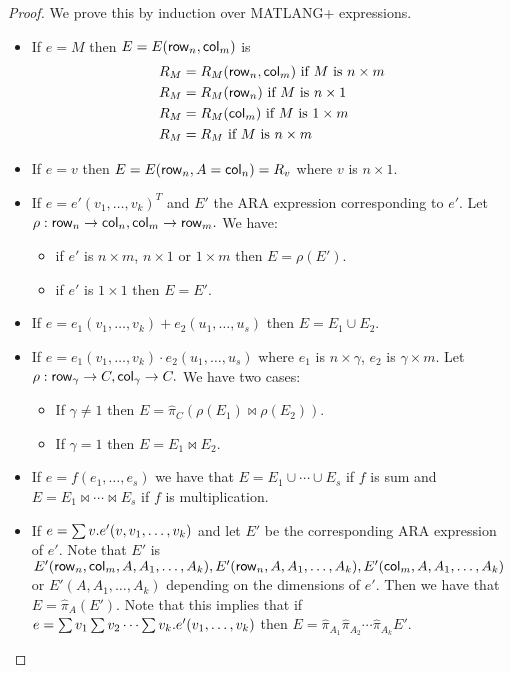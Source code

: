 \begin{proof}

We prove this by induction over MATLANG+ expressions.
\begin{itemize}
	\item If $e=M$ then $E=E(\mathsf{row}_n,\mathsf{col}_m)$ is 
		\begin{align*}
			R_{M}&=R_{M}(\mathsf{row}_n,\mathsf{col}_m) \text{ if } M \text{ is } n\times m \\
			R_{M}&=R_{M}(\mathsf{row}_n) \text{ if } M \text{ is } n\times 1 \\
			R_{M}&=R_{M}(\mathsf{col}_m) \text{ if } M \text{ is } 1\times m \\
			R_{M}&=R_{M} \text{ if } M \text{ is } n\times m 
		\end{align*}
	\item If $e=v$ then $E=E(\mathsf{row}_n,A=\mathsf{col}_n)=R_{v}$ where $v$ is $n\times 1$.
	\item If $e=e'(v_1,\ldots,v_k)^T$ and $E'$ the ARA expression corresponding to $e'$. Let $\rho:\mathsf{row}_n\rightarrow\mathsf{col}_n,\mathsf{col}_m\rightarrow\mathsf{row}_m.$ We have:
		\begin{itemize}
			\item if $e'$ is $n\times m$, $n\times 1$ or $1\times m$ then $E=\rho\left( E'\right).$
			\item if $e'$ is $1\times 1$ then $E=E'$.
		\end{itemize}
	\item If $e=e_1(v_1,\ldots,v_k)+e_2(u_1,\ldots,u_s)$ then $E=E_1\cup E_2$.
	\item If $e=e_1(v_1,\ldots,v_k)\cdot e_2(u_1,\ldots,u_s)$ where $e_1$ is $n\times\gamma$, $e_2$ is $\gamma\times m$. Let $\rho:\mathsf{row}_\gamma\rightarrow C,\mathsf{col}_\gamma\rightarrow C.$ We have two cases:
		\begin{itemize}
			\item If $\gamma\neq 1$ then $E=\widehat{\pi}_C\left( \rho\left(E_1\right)\bowtie\rho\left( E_2\right)\right).$
			\item If $\gamma = 1$ then $E=E_1\bowtie E_2$.
		\end{itemize}
	\item If $e=f(e_1,\ldots,e_s)$ we have that $E=E_1\cup\cdots\cup E_s$ if $f$ is sum and $E=E_1\bowtie\cdots\bowtie E_s$ if $f$ is multiplication.
	\item If $e=\textstyle\sum v.e'(v,v_1,\ldots, v_k)$ and let $E'$ be the corresponding ARA expression of $e'$. Note that $E'$ is $E'(\mathsf{row}_n, \mathsf{col}_m,A,A_1,\ldots,A_k), E'(\mathsf{row}_n,A,A_1,\ldots,A_k), E'(\mathsf{col}_m,A,A_1,\ldots,A_k)$ or $E'(A,A_1,\ldots,A_k)$ depending on the dimensions of $e'$. Then we have that $E=\widehat{\pi}_A(E').$ Note that this implies that if $e=\textstyle\sum v_1\textstyle\sum v_2\cdots\textstyle\sum v_k.e'(v_1,\ldots,v_k)$ then $E=\widehat{\pi}_{A_1}\widehat{\pi}_{A_2}\cdots\widehat{\pi}_{A_k}E'.$
\end{itemize}

\end{proof}

